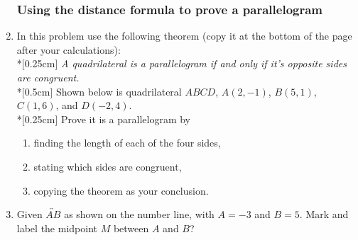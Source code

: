 \documentclass[12pt, twoside]{article}
\begin{document}
\begin{enumerate}
  \subsubsection*{Using the distance formula to prove a parallelogram}
    \item In this problem use the following theorem (copy it at the bottom of the page after your calculations): \\*[0.25cm]
    \emph{A quadrilateral is a parallelogram if and only if it's opposite sides are congruent.}\\*[0.5cm]
    Shown below is quadrilateral $ABCD$, $A(2,-1)$, $B(5,1)$, $C(1,6)$, and $D(-2,4)$. \\*[0.25cm]
    Prove it is a parallelogram by
    \begin{enumerate}
      \item finding the length of each of the four sides,
      \item stating which sides are congruent,
      \item copying the theorem as your conclusion.
    \end{enumerate}
    \begin{flushright} %
    \end{flushright}

    \newpage
    \item Given $\overleftrightarrow{AB}$ as shown on the number line, with $A=-3$ and $B=5$. Mark and label the midpoint $M$ between $A$ and $B$?\\[20pt] %
      

\end{enumerate}
\end{document}
